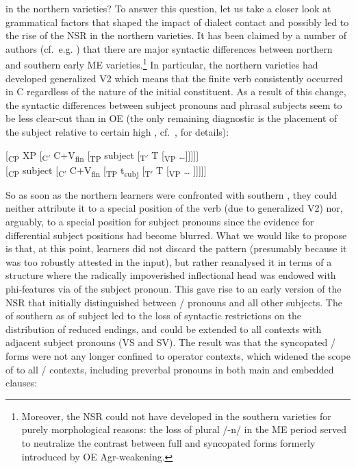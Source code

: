 \documentclass[output=paper]{langsci/langscibook}
\begin{document}
in the northern varieties? To answer this question, let us take a closer look
at grammatical factors that shaped the impact of dialect contact and possibly
led to the rise of the \gls{NSR} in the northern
varieties. It has been claimed by a number of authors (cf.\ e.g.
\citealt{Krochtaylor:1997,Trips:2002}) that there are major syntactic
differences between northern and southern early ME
varieties.\footnote{Moreover, the \gls{NSR} could not
    have developed in the southern varieties for purely morphological reasons:
    the loss of plural /-n/ in the \gls{ME} period served to
    neutralize the contrast between full and syncopated forms formerly
    introduced by \gls{OE} Agr-weakening.} In particular, the northern
    varieties had developed generalized V2 which means that the finite verb
    consistently occurred in C regardless of the nature of the initial
    constituent.  As a result of this change, the syntactic differences between
    subject pronouns and phrasal subjects seem to be less clear-cut than in
    \gls{OE} (the only remaining diagnostic is the placement of the subject
    relative to certain high , cf.\ \citealt{deHaas:2011},
    \citealt{deHaasandvanKemenade:2015} for details):

\ea
\ea \mbox[\textsubscript{CP} XP [\textsubscript{C$'$} C$+$V\textsubscript{fin} [\textsubscript{TP} subject [\textsubscript{T$'$} T [\textsubscript{VP} \ldots{}]]]]]\\
\ex \mbox[\textsubscript{CP} subject [\textsubscript{C$'$} C$+$V\textsubscript{fin} [\textsubscript{TP} t\textsubscript{subj} [\textsubscript{T$'$} T [\textsubscript{VP} \ldots{} ]]]]]
\z
\z

So as soon as the northern learners were confronted with southern
, they could neither attribute it to a special position
of the verb (due to generalized V2) nor, arguably, to a special position for
subject pronouns since the evidence for differential subject positions had
become blurred. What we would like to propose is that, at this point, learners
did not discard the pattern (presumably because it was too robustly attested in
the input), but rather reanalysed it in terms of a structure where the
radically impoverished inflectional head was endowed with
phi-features via  of the subject pronoun.
This gave rise to an early version of the \gls{NSR} that initially
distinguished between \Fpl/\Spl{} pronouns and all other subjects. The
 of southern  as 
of subject  led to the loss of syntactic restrictions on the
distribution of reduced endings, and  could be
extended to all contexts with adjacent subject pronouns (VS and SV). The result
was that the syncopated \Fpl/\Spl{} forms were not any longer confined to
operator contexts, which widened the scope of  to all
\Fpl/\Spl{} contexts, including preverbal pronouns in both main and embedded
clauses:
\end{document}
